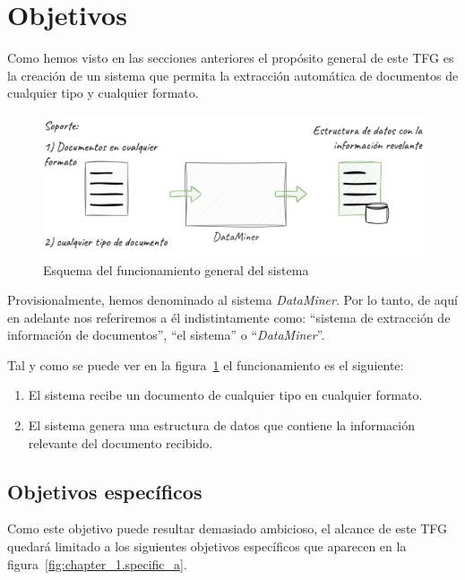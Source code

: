 \section{Objetivos}\label{sec:objetives}

Como hemos visto en las secciones anteriores el propósito general de este TFG es la creación de un sistema que permita
la extracción automática de documentos de cualquier tipo y cualquier formato.

\begin{figure}[ht]
    \begin{center}
        \includegraphics[width=\textwidth]{./chapter/1/images/chapter_1.overview}
        \caption{Esquema del funcionamiento general del sistema}
        \label{fig:chapter_1.overview}
    \end{center}
\end{figure}

Provisionalmente, hemos denominado al sistema \textit{DataMiner}.
Por lo tanto, de aquí en adelante nos referiremos a él indistintamente como: ``sistema de extracción de información de
documentos'', ``el sistema'' o ``\textit{DataMiner}''.

Tal y como se puede ver en la figura~\ref{fig:chapter_1.overview} el funcionamiento es el siguiente:

\begin{enumerate}
    \item
    El sistema recibe un documento de cualquier tipo en cualquier formato.

    \item
    El sistema genera una estructura de datos que contiene la información relevante del documento recibido.
\end{enumerate}

\subsection*{Objetivos específicos}

Como este objetivo puede resultar demasiado ambicioso, el alcance de este TFG quedará limitado a los siguientes
objetivos específicos que aparecen en la figura~\ref{fig:chapter_1.specific_a}.

